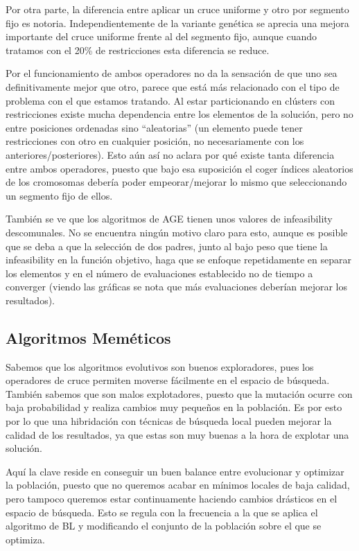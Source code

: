 Por otra parte, la diferencia entre aplicar un cruce uniforme y otro por segmento fijo es notoria. Independientemente de la variante genética se aprecia una mejora importante del cruce uniforme frente al del segmento fijo, aunque cuando tratamos con el 20\% de restricciones esta diferencia se reduce.

Por el funcionamiento de ambos operadores no da la sensación de que uno sea definitivamente mejor que otro, parece que está más relacionado con el tipo de problema con el que estamos tratando. Al estar particionando en clústers con restricciones existe mucha dependencia entre los elementos de la solución, pero no entre posiciones ordenadas sino ``aleatorias'' (un elemento puede tener restricciones con otro en cualquier posición, no necesariamente con los anteriores/posteriores). Esto aún así no aclara por qué existe tanta diferencia entre ambos operadores, puesto que bajo esa suposición el coger índices aleatorios de los cromosomas debería poder empeorar/mejorar lo mismo que seleccionando un segmento fijo de ellos.

También se ve que los algoritmos de AGE tienen unos valores de infeasibility descomunales. No se encuentra ningún motivo claro para esto, aunque es posible que se deba a que la selección de dos padres, junto al bajo peso que tiene la infeasibility en la función objetivo, haga que se enfoque repetidamente en separar los elementos y en el número de evaluaciones establecido no de tiempo a converger (viendo las gráficas se nota que más evaluaciones deberían mejorar los resultados).

\subsection{Algoritmos Meméticos}

Sabemos que los algoritmos evolutivos son buenos exploradores, pues los operadores de cruce permiten moverse fácilmente en el espacio de búsqueda. También sabemos que son malos explotadores, puesto que la mutación ocurre con baja probabilidad y realiza cambios muy pequeños en la población. Es por esto por lo que una hibridación con técnicas de búsqueda local pueden mejorar la calidad de los resultados, ya que estas son muy buenas a la hora de explotar una solución.

Aquí la clave reside en conseguir un buen balance entre evolucionar y optimizar la población, puesto que no queremos acabar en mínimos locales de baja calidad, pero tampoco queremos estar continuamente haciendo cambios drásticos en el espacio de búsqueda. Esto se regula con la frecuencia a la que se aplica el algoritmo de BL y modificando el conjunto de la población sobre el que se optimiza.

